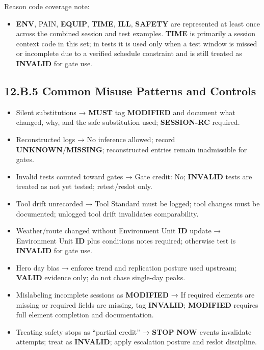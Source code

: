 \documentclass[10pt]{article}
\begin{document}
\endgroup

Reason code coverage note:

\begin{itemize}
\item \textbf{ENV}, PAIN, \textbf{EQUIP}, \textbf{TIME}, \textbf{ILL}, \textbf{SAFETY} are represented at least once across the combined session and test examples. \textbf{TIME} is primarily a session context code in this set; in tests it is used only when a test window is missed or incomplete due to a verified schedule constraint and is still treated as \textbf{INVALID} for gate use.
\end{itemize}

\newpage

\subsection*{12.B.5 Common Misuse Patterns and Controls}
{}

\begin{itemize}
\item Silent substitutions → \textbf{MUST} tag \textbf{MODIFIED} and document what changed, why, and the safe substitution used; \textbf{SESSION-RC} required.
\item Reconstructed logs → No inference allowed; record \textbf{UNKNOWN}/\textbf{MISSING}; reconstructed entries remain inadmissible for gates.
\item Invalid tests counted toward gates → Gate credit: No; \textbf{INVALID} tests are treated as not yet tested; retest/reslot only.
\item Tool drift unrecorded → Tool Standard must be logged; tool changes must be documented; unlogged tool drift invalidates comparability.
\item Weather/route changed without Environment Unit \textbf{ID} update → Environment Unit \textbf{ID} plus conditions notes required; otherwise test is \textbf{INVALID} for gate use.
\item Hero day bias → enforce trend and replication posture used upstream; \textbf{VALID} evidence only; do not chase single-day peaks.
\item Mislabeling incomplete sessions as \textbf{MODIFIED} → If required elements are missing or required fields are missing, tag \textbf{INVALID}; \textbf{MODIFIED} requires full element completion and documentation.
\item Treating safety stops as “partial credit” → \textbf{STOP} \textbf{NOW} events invalidate attempts; treat as \textbf{INVALID}; apply escalation posture and reslot discipline.
\end{itemize}
\end{document}
